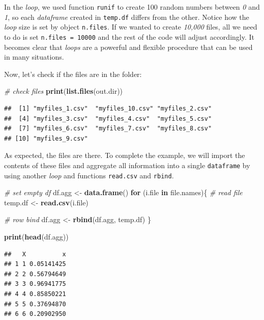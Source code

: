 \documentclass[11pt,]{book}
\newenvironment{Shaded}{\begin{snugshade}}{\end{snugshade}}
\newcommand{\KeywordTok}[1]{\textcolor[rgb]{0.27,0.27,0.27}{\textbf{#1}}}
\newcommand{\StringTok}[1]{\textcolor[rgb]{0.5,0.5,0.5}{#1}}
\newcommand{\CommentTok}[1]{\textcolor[rgb]{0.56,0.35,0.01}{\textit{#1}}}
\newcommand{\ControlFlowTok}[1]{\textcolor[rgb]{0.13,0.29,0.53}{\textbf{#1}}}
\newcommand{\NormalTok}[1]{#1}
\begin{document}
In the \emph{loop}, we used function \texttt{runif} to create 100 random
numbers between \emph{0} and \emph{1}, so each \emph{dataframe} created
in \texttt{temp.df} differs from the other. Notice how the \emph{loop}
size is set by object \texttt{n.files}. If we wanted to create
\emph{10,000} files, all we need to do is set \texttt{n.files\ =\ 10000}
and the rest of the code will adjust accordingly. It becomes clear that
\emph{loops} are a powerful and flexible procedure that can be used in
many situations.

Now, let's check if the files are in the folder:

\begin{Shaded}
\begin{Highlighting}[]
\CommentTok{# check files}
\KeywordTok{print}\NormalTok{(}\KeywordTok{list.files}\NormalTok{(out.dir))}
\end{Highlighting}
\end{Shaded}

\begin{verbatim}
##  [1] "myfiles_1.csv"  "myfiles_10.csv" "myfiles_2.csv" 
##  [4] "myfiles_3.csv"  "myfiles_4.csv"  "myfiles_5.csv" 
##  [7] "myfiles_6.csv"  "myfiles_7.csv"  "myfiles_8.csv" 
## [10] "myfiles_9.csv"
\end{verbatim}

As expected, the files are there. To complete the example, we will
import the contents of these files and aggregate all information into a
single \texttt{dataframe} by using another \emph{loop} and functions
\texttt{read.csv} and \texttt{rbind}.

\begin{Shaded}
\begin{Highlighting}[]
\CommentTok{# set empty df}
\NormalTok{df.agg <-}\StringTok{ }\KeywordTok{data.frame}\NormalTok{()}
\ControlFlowTok{for}\NormalTok{ (i.file }\ControlFlowTok{in}\NormalTok{ file.names)\{}
  \CommentTok{# read file}
\NormalTok{  temp.df <-}\StringTok{ }\KeywordTok{read.csv}\NormalTok{(i.file)}
  
  \CommentTok{# row bind }
\NormalTok{  df.agg <-}\StringTok{ }\KeywordTok{rbind}\NormalTok{(df.agg, temp.df)}
\NormalTok{\}}

\KeywordTok{print}\NormalTok{(}\KeywordTok{head}\NormalTok{(df.agg))}
\end{Highlighting}
\end{Shaded}

\begin{verbatim}
##   X          x
## 1 1 0.05141425
## 2 2 0.56794649
## 3 3 0.96941775
## 4 4 0.85850221
## 5 5 0.37694870
## 6 6 0.20902950
\end{verbatim}
\end{document}
